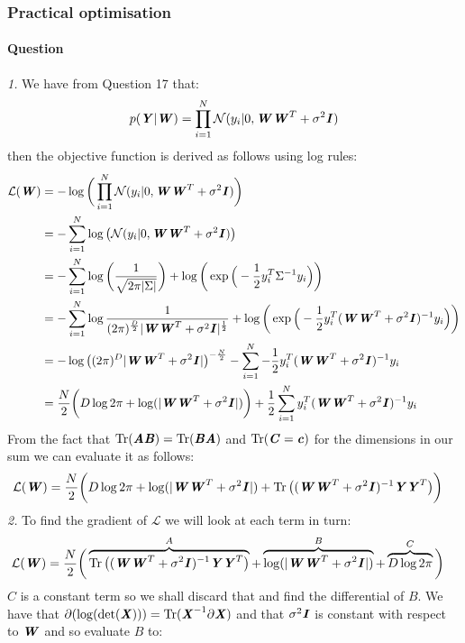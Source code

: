 \documentclass{article}
\newcounter{question}
\newcommand{\question}{\stepcounter{question}\paragraph{Question \thequestion}}
\newcommand{\mat}[1]{\textbf{\textit{#1}}}
\DeclareMathOperator{\Tr}{Tr}
\begin{document}
\subsubsection{Practical optimisation}
\question \emph{1.} We have from Question 17 that:
\begin{align*}
	p(\mat{Y}|\mat{W}) = \prod_{i=1}^N\mathcal{N}(y_i|0,\mat{W}\mat{W}^T + \sigma^2\mat{I})
\end{align*}
then the objective function is derived as follows using log rules:
\begin{align*}
	\mathcal{L}(\mat{W}) &= -\log\bigg(\prod_{i=1}^N\mathcal{N}(y_i|0,\mat{W}\mat{W}^T + \sigma^2\mat{I})\bigg) \\
	&= -\sum_{i=1}^N\log\big(\mathcal{N}(y_i|0,\mat{W}\mat{W}^T + \sigma^2\mat{I})\big) \\
	&= -\sum_{i=1}^N\log\bigg(\frac{1}{\sqrt{2\pi\lvert\Sigma\rvert}}\bigg)+\log\bigg(\exp\Big(-\frac{1}{2}y_i^T\Sigma^{-1} y_i\Big)\bigg) \\
	&= -\sum_{i=1}^N\log\frac{1}{(2\pi)^{\frac{D}{2}}\lvert\mat{W}\mat{W}^T+\sigma^2\mat{I}\rvert^{\frac{1}{2}}}+\log\bigg(\exp\Big(-\frac{1}{2}y_i^T(\mat{W}\mat{W}^T+\sigma^2\mat{I})^{-1} y_i\Big)\bigg) \\
	&= -\log\big((2\pi)^D\lvert\mat{W}\mat{W}^T+\sigma^2\mat{I}\vert\big)^{-\frac{N}{2}} - \sum_{i=1}^N-\frac{1}{2}y_i^T(\mat{W}\mat{W}^T+\sigma^2\mat{I})^{-1} y_i \\
	&= \frac{N}{2}\bigg(D\log2\pi + \log(\lvert\mat{W}\mat{W}^T+\sigma^2\mat{I}\vert)\bigg) + \frac{1}{2}\sum_{i=1}^Ny_i^T(\mat{W}\mat{W}^T+\sigma^2\mat{I})^{-1} y_i \\
\end{align*}
From the fact that $\Tr(\mat{A}\mat{B}) = \Tr(\mat{B}\mat{A})$ and $\Tr(\mat{C} = \mat{c})$ for the dimensions in our sum we can evaluate it as follows:
\begin{align*}
	\mathcal{L}(\mat{W}) &= \frac{N}{2}\bigg(D\log2\pi + \log(\lvert\mat{W}\mat{W}^T+\sigma^2\mat{I}\vert) + \Tr\big((\mat{W}\mat{W}^T+\sigma^2\mat{I})^{-1}\mat{Y}\mat{Y}^T\big)\bigg)
\end{align*}
\emph{2.} To find the gradient of $\mathcal{L}$ we will look at each term in turn:
\begin{align*}
	\mathcal{L}(\mat{W}) &= \frac{N}{2}\bigg(\overbrace{\Tr\big((\mat{W}\mat{W}^T+\sigma^2\mat{I})^{-1}\mat{Y}\mat{Y}^T\big)}^{A} + \overbrace{\log(\lvert\mat{W}\mat{W}^T+\sigma^2\mat{I}\vert)}^{B} + \overbrace{D\log2\pi}^{C}\bigg)
\end{align*}
$C$ is a constant term so we shall discard that and find the differential of $B$. We have that $\partial(\log(\det(\mat{X}))) = \Tr(\mat{X}^{-1}\partial\mat{X})$ and that $\sigma^2\mat{I}$ is constant with respect to $\mat{W}$ and so evaluate $B$ to:
\end{document}

